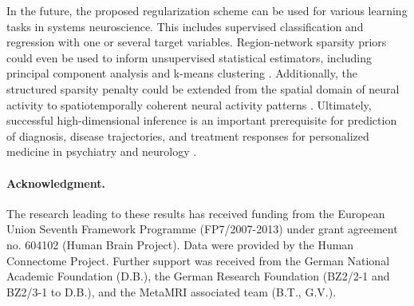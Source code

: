 \documentclass{article} %
\begin{document}
In the future,
the proposed regularization scheme can be used for various
learning tasks in systems neuroscience.
This includes supervised classification and regression
with one or several target variables.
%
Region-network sparsity priors could even be used to inform
unsupervised statistical estimators,
including principal component analysis
\cite{jenatton2009structured}
and
k-means clustering \cite{???}.
%
Additionally,
the structured sparsity penalty could be extended
from the spatial domain of neural activity to
spatiotemporally coherent neural activity patterns
\cite{gramfort2011tracking}.
%
Ultimately,
successful high-dimensional inference is
an important prerequisite
for prediction of diagnosis,
disease trajectories, and treatment responses
for personalized medicine in psychiatry and neurology
\cite{gabrieli2015prediction}.



\paragraph{Acknowledgment.}
{\small The research leading to these results has received funding from the
European Union Seventh Framework Programme (FP7/2007-2013)
under grant agreement no. 604102 (Human Brain Project).
Data were provided by the Human Connectome Project.
Further support was received from
the German National Academic Foundation (D.B.),
the German Research Foundation (BZ2/2-1 and BZ2/3-1 to D.B.),
and the MetaMRI associated team (B.T., G.V.).
}

  
\small
% 


\end{document}
